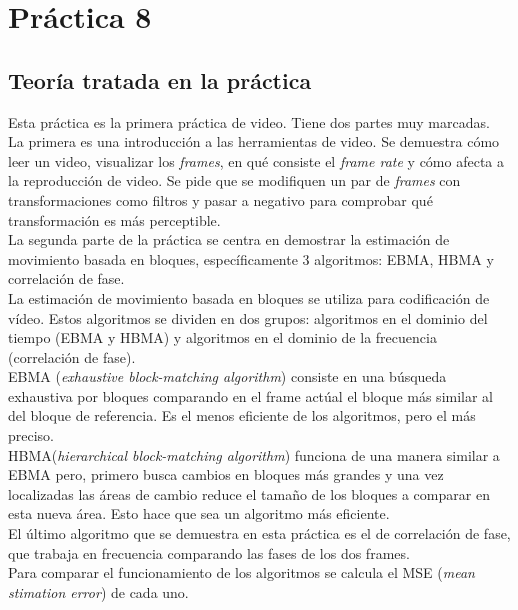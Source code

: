 \documentclass[a4paper,12pt]{report}
\begin{document}
\section{ Práctica 8}
\subsection{Teoría tratada en la práctica}

Esta práctica es la primera práctica de video. Tiene dos partes muy marcadas.\\

La primera es una introducción a las herramientas de video. Se demuestra cómo leer un video, visualizar los \emph{frames}, en qué consiste el \emph{frame rate} y cómo afecta a la reproducción de video. Se pide que se modifiquen un par de \emph{frames} con transformaciones como filtros y pasar a negativo para comprobar qué transformación es más perceptible.\\

La segunda parte de la práctica se centra en demostrar la estimación de movimiento basada en bloques, específicamente 3 algoritmos: EBMA, HBMA y correlación de fase.\\

La estimación de movimiento basada en bloques se utiliza para codificación de vídeo. Estos algoritmos se dividen en dos grupos: algoritmos en el dominio del tiempo (EBMA y HBMA) y algoritmos en el dominio de la frecuencia (correlación de fase).\\

EBMA (\emph{exhaustive block-matching algorithm}) consiste en una búsqueda exhaustiva por bloques comparando en el frame actúal el bloque más similar al del bloque de referencia. Es el menos eficiente de los algoritmos, pero el más preciso.\\

HBMA(\emph{hierarchical block-matching algorithm}) funciona de una manera similar a EBMA pero, primero busca cambios en bloques más grandes y una vez localizadas las áreas de cambio reduce el tamaño de los bloques a comparar en esta nueva área. Esto hace que sea un algoritmo más eficiente.\\

El último algoritmo que se demuestra en esta práctica es el de correlación de fase, que trabaja en frecuencia comparando las fases de los dos frames.\\

Para comparar el funcionamiento de los algoritmos se calcula el MSE (\emph{mean stimation error}) de cada uno.\\
\end{document}
